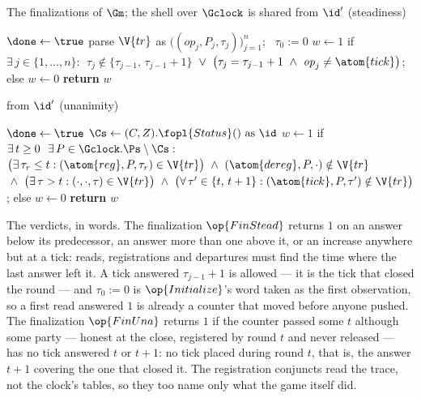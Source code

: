 \documentclass[10pt,oneside,openany]{book}
\theoremstyle{accentdef}
\theoremstyle{accentplain}
\begin{document}
\begin{interface}[nofloat]{The finalizations of $\Gm$; the shell over $\Gclock$ is shared}
 \quad from $\id'$ \quad (steadiness)
\begin{algorithmic}[1]
\algcont
\Req{$\neg\done$}
\State $\done \gets \true$
\State parse $\V{tr}$ as $\bigl((\mathit{op}_j,P_j,\tau_j)\bigr)_{j=1}^{n}$; \ $\tau_0 := 0$
\State $w \gets 1$ if $\exists\, j \in \{1,\dots,n\} :\ \
       \tau_j \notin \{\tau_{j-1},\,\tau_{j-1}+1\}$ \label{ln:gstead}
\State \quad ${}\vee\ \bigl(\tau_j = \tau_{j-1}+1 \ \wedge\ \mathit{op}_j \neq \atom{tick}\bigr)$;
\State else $w \gets 0$
\State \textbf{return} $w$
\algsave
\end{algorithmic}
\vspace{1.4ex}

 \quad from $\id'$ \quad (unanimity)
\begin{algorithmic}[1]
\algcont
\Req{$\neg\done$}
\State $\done \gets \true$
\State $\Cs \gets (C,Z).\fopl{Status}() \text{ as } \id$
\State $w \gets 1$ if $\exists\, t \geq 0
       \ \ \exists\, P \in \Gclock.\Ps \setminus \Cs :$ \label{ln:guna}
\State \quad $\bigl(\exists\, \tau_r \leq t : (\atom{reg},P,\tau_r) \in \V{tr}\bigr)
       \ \wedge\ (\atom{dereg},P,\cdot) \notin \V{tr}$
\State \quad ${}\wedge\ \bigl(\exists\, \tau > t : (\cdot,\cdot,\tau) \in \V{tr}\bigr)
       \ \wedge\ \bigl(\forall\, \tau' \in \{t,\,t+1\} :
       (\atom{tick},P,\tau') \notin \V{tr}\bigr)$;
\State else $w \gets 0$
\State \textbf{return} $w$
\algsave
\end{algorithmic}
\end{interface}

The verdicts, in words. The finalization $\op{FinStead}$ returns $1$ on an answer below its predecessor, an answer
more than one above it, or an increase anywhere but at a tick: reads, registrations and
departures must find the time where the last answer left it. A tick answered $\tau_{j-1}+1$ is
allowed --- it is the tick that closed the round --- and $\tau_0 := 0$ is $\op{Initialize}$'s
word taken as the first observation, so a first read answered $1$ is already a counter that moved
before anyone pushed. The finalization $\op{FinUna}$ returns $1$ if the counter passed some $t$ although some party
--- honest at the close, registered by round $t$ and never released --- has no tick answered $t$
or $t+1$: no tick placed during round $t$, that is, the answer $t+1$ covering the one that closed
it. The registration conjuncts read the trace, not the clock's tables, so they too name only what
the game itself did.
\end{document}
